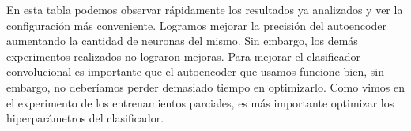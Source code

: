 \documentclass[aps,prl,twocolumn,groupedaddress]{revtex4-2}
\begin{document}
En esta tabla podemos observar rápidamente los resultados ya analizados y ver la configuración más conveniente. Logramos mejorar la precisión del autoencoder aumentando la cantidad de neuronas del mismo. Sin embargo, los demás experimentos realizados no lograron mejoras. Para mejorar el clasificador convolucional es importante que el autoencoder que usamos funcione bien, sin embargo, no deberíamos perder demasiado tiempo en optimizarlo. Como vimos en el experimento de los entrenamientos parciales, es más importante optimizar los hiperparámetros del clasificador.


%


\end{document}
